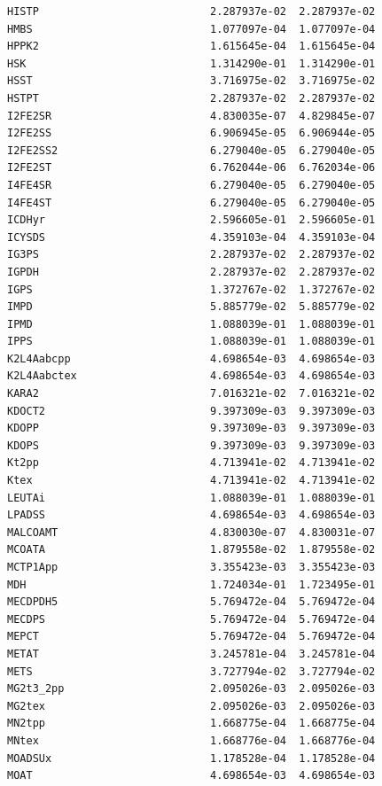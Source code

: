 \documentclass{scrartcl}
\begin{document}
\begin{enumerate}
\begin{lstlisting}
HISTP                           2.287937e-02  2.287937e-02
HMBS                            1.077097e-04  1.077097e-04
HPPK2                           1.615645e-04  1.615645e-04
HSK                             1.314290e-01  1.314290e-01
HSST                            3.716975e-02  3.716975e-02
HSTPT                           2.287937e-02  2.287937e-02
I2FE2SR                         4.830035e-07  4.829845e-07
I2FE2SS                         6.906945e-05  6.906944e-05
I2FE2SS2                        6.279040e-05  6.279040e-05
I2FE2ST                         6.762044e-06  6.762034e-06
I4FE4SR                         6.279040e-05  6.279040e-05
I4FE4ST                         6.279040e-05  6.279040e-05
ICDHyr                          2.596605e-01  2.596605e-01
ICYSDS                          4.359103e-04  4.359103e-04
IG3PS                           2.287937e-02  2.287937e-02
IGPDH                           2.287937e-02  2.287937e-02
IGPS                            1.372767e-02  1.372767e-02
IMPD                            5.885779e-02  5.885779e-02
IPMD                            1.088039e-01  1.088039e-01
IPPS                            1.088039e-01  1.088039e-01
K2L4Aabcpp                      4.698654e-03  4.698654e-03
K2L4Aabctex                     4.698654e-03  4.698654e-03
KARA2                           7.016321e-02  7.016321e-02
KDOCT2                          9.397309e-03  9.397309e-03
KDOPP                           9.397309e-03  9.397309e-03
KDOPS                           9.397309e-03  9.397309e-03
Kt2pp                           4.713941e-02  4.713941e-02
Ktex                            4.713941e-02  4.713941e-02
LEUTAi                          1.088039e-01  1.088039e-01
LPADSS                          4.698654e-03  4.698654e-03
MALCOAMT                        4.830030e-07  4.830031e-07
MCOATA                          1.879558e-02  1.879558e-02
MCTP1App                        3.355423e-03  3.355423e-03
MDH                             1.724034e-01  1.723495e-01
MECDPDH5                        5.769472e-04  5.769472e-04
MECDPS                          5.769472e-04  5.769472e-04
MEPCT                           5.769472e-04  5.769472e-04
METAT                           3.245781e-04  3.245781e-04
METS                            3.727794e-02  3.727794e-02
MG2t3_2pp                       2.095026e-03  2.095026e-03
MG2tex                          2.095026e-03  2.095026e-03
MN2tpp                          1.668775e-04  1.668775e-04
MNtex                           1.668776e-04  1.668776e-04
MOADSUx                         1.178528e-04  1.178528e-04
MOAT                            4.698654e-03  4.698654e-03

\end{lstlisting}
\end{enumerate}
\end{document}
